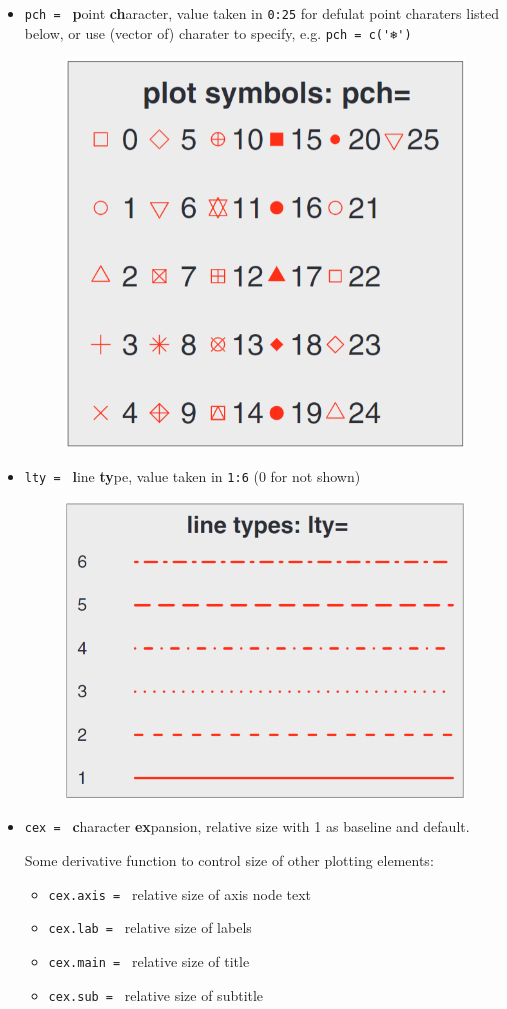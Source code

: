 \begin{itemize}[topsep=2pt,itemsep=0pt]
\begin{itemize}[topsep=2pt,itemsep=0pt]
        \item \lstinline|pch = | \textbf{p}oint \textbf{ch}aracter, value taken in \lstinline|0:25| for defulat point charaters listed below, or use (vector of) charater to specify, e.g. \lstinline|pch = c('❄')|
        \begin{figure}[H]
            \centering
            \includegraphics[width=0.3\linewidth]{sections/images/2022-08-18-11-14-15.png}

            \label{}
        \end{figure}

        \item \lstinline|lty = | \textbf{l}ine \textbf{ty}pe, value taken in \lstinline|1:6| (0 for not shown)
        \begin{figure}[H]
            \centering
            \includegraphics[width=0.4\linewidth]{sections/images/2022-08-18-11-15-34.png}

            \label{}
        \end{figure}

        \item \lstinline|cex = | \textbf{c}haracter \textbf{ex}pansion, relative size with 1 as baseline and default. 
        
        Some derivative function to control size of other plotting elements:
        \begin{itemize}[topsep=2pt,itemsep=0pt]
            \item \lstinline|cex.axis = | relative size of axis node text
            \item \lstinline|cex.lab = | relative size of labels
            \item \lstinline|cex.main = | relative size of title 
            \item \lstinline|cex.sub = | relative size of subtitle 
        \end{itemize}
        

\end{itemize}
\end{itemize}
